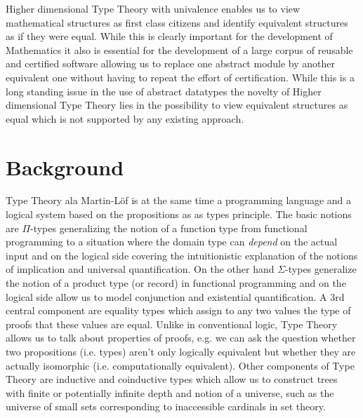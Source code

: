 \documentclass[a4paper]{article}
\begin{document}
Higher dimensional Type Theory with univalence enables us to view
mathematical structures as first class citizens and identify
equivalent structures as if they were equal. While this is clearly
important for the development of Mathematics it also is essential for
the development of a large corpus of reusable and certified software
allowing us to replace one abstract module by another equivalent one
without having to repeat the effort of certification. While this is a
long standing issue in the use of abstract datatypes the novelty of
Higher dimensional Type Theory lies in the possibility to view equivalent
structures as equal which is not supported by any existing approach.

\section{Background}

Type Theory ala Martin-L\"of is at the same time a programming
language and a logical system based on the propositions as as types
principle. The basic notions are $\Pi$-types generalizing the notion
of a function type from functional programming to a situation where
the domain type can \emph{depend} on the actual input and on the
logical side covering the intuitionistic  explanation of the notions of 
implication and universal quantification. On the other hand
$\Sigma$-types generalize the notion of a product type (or record) in
functional programming and on the logical side allow us to model
conjunction and existential quantification. A 3rd central component are
equality types which assign to any two values the type of proofs that 
these values are equal. Unlike in conventional logic, Type Theory
allows us to talk about properties of proofs, e.g. we can ask the
question whether two propositions (i.e. types) aren't only logically
equivalent but whether they are actually isomorphic
(i.e. computationally equivalent). Other components of Type Theory are
inductive and coinductive types which allow us to construct trees
with finite or potentially infinite depth and notion of a universe,
such as the universe of small sets corresponding to inaccessible
cardinals in set theory.
\end{document}
